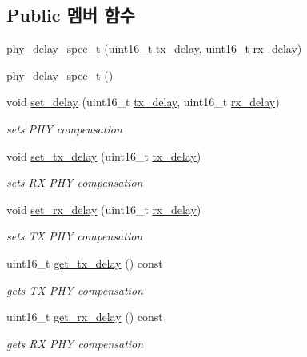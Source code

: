 \subsection*{Public 멤버 함수}
\begin{DoxyCompactItemize}
\item 
\hyperlink{classphy__delay__spec__t_ad48b720a8793ca8b2fd5f32515cc9a9a}{phy\+\_\+delay\+\_\+spec\+\_\+t} (uint16\+\_\+t \hyperlink{classphy__delay__spec__t_a70035b9951b2e0b8c74d7dd90096f279}{tx\+\_\+delay}, uint16\+\_\+t \hyperlink{classphy__delay__spec__t_a8a9e152109919f43c26fe6cfa5afea96}{rx\+\_\+delay})
\item 
\hyperlink{classphy__delay__spec__t_afd9f15675be9a33d27b61a8a0ef513b7}{phy\+\_\+delay\+\_\+spec\+\_\+t} ()
\item 
void \hyperlink{classphy__delay__spec__t_ab27bb396adc2edbcfea7c08fc9e0f5c0}{set\+\_\+delay} (uint16\+\_\+t \hyperlink{classphy__delay__spec__t_a70035b9951b2e0b8c74d7dd90096f279}{tx\+\_\+delay}, uint16\+\_\+t \hyperlink{classphy__delay__spec__t_a8a9e152109919f43c26fe6cfa5afea96}{rx\+\_\+delay})
\begin{DoxyCompactList}\small\item\em sets P\+HY compensation \end{DoxyCompactList}\item 
void \hyperlink{classphy__delay__spec__t_a0076949a366783fd6d4001b433962651}{set\+\_\+tx\+\_\+delay} (uint16\+\_\+t \hyperlink{classphy__delay__spec__t_a70035b9951b2e0b8c74d7dd90096f279}{tx\+\_\+delay})
\begin{DoxyCompactList}\small\item\em sets RX P\+HY compensation \end{DoxyCompactList}\item 
void \hyperlink{classphy__delay__spec__t_a7f395fc382f4248059db572709bcc911}{set\+\_\+rx\+\_\+delay} (uint16\+\_\+t \hyperlink{classphy__delay__spec__t_a8a9e152109919f43c26fe6cfa5afea96}{rx\+\_\+delay})
\begin{DoxyCompactList}\small\item\em sets TX P\+HY compensation \end{DoxyCompactList}\item 
uint16\+\_\+t \hyperlink{classphy__delay__spec__t_a16d54ec98edda6808ec482ff7a9a31e7}{get\+\_\+tx\+\_\+delay} () const 
\begin{DoxyCompactList}\small\item\em gets TX P\+HY compensation \end{DoxyCompactList}\item 
uint16\+\_\+t \hyperlink{classphy__delay__spec__t_a5ba24721667049571e15c5c332f5e2a7}{get\+\_\+rx\+\_\+delay} () const 
\begin{DoxyCompactList}\small\item\em gets RX P\+HY compensation \end{DoxyCompactList}\end{DoxyCompactItemize}
